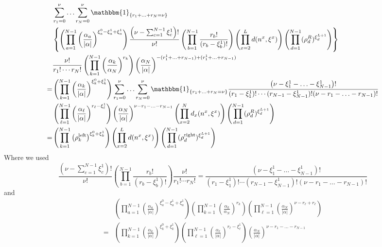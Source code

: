 \documentclass[10pt]{article}
\numberwithin{equation}{section}
\numberwithin{equation}{subsection}
\begin{document}
\begin{align}\label{pezzo1}
	&\sum_{r_{1}=0}^{\nu}\ldots\sum_{r_{N}=0}^{\nu}\mathbbm{1}_{\{r_{1}+\ldots+r_{N}=\nu\}}\nonumber\\
	&\left\{\left(\prod_{a=1}^{N-1}\left(\frac{\alpha_{a}}{|\alpha|}\right)^{\xi_{a}^{0}-\xi_{a}^{1}+\xi_{a}^{1}}\right)\frac{\left(\nu-\sum_{c=1}^{N-1}\xi_{c}^{1}\right)!}{\nu!}\left(\prod_{b=1}^{N-1}\frac{r_{b}!}{(r_{b}-\xi^{1}_{b})!}\right)\left(\prod_{x=2}^{L}d(n^{x},\xi^{x})\right)\left(\prod_{d=1}^{N-1}(\rho_{d}^{R})^{\xi_{d}^{L+1}}\right)\right\}\nonumber\\
	&	\frac{\nu!}{r_{1}!\cdots r_{N}!}\left(\prod_{k=1}^{N-1}\left(\frac{\alpha_{k}}{\alpha_{N}}\right)^{r_{k}}\right)\left(\frac{\alpha_{N}}{|\alpha|}\right)^{-(r_{1}^{1}+\ldots+r_{N-1})+(r_{1}^{1}+\ldots+r_{N-1})}\nonumber\\=&
	\left(\prod_{k=1}^{N-1}\left(\frac{\alpha_{k}}{|\alpha|}\right)^{\xi_{k}^{0}+\xi_{k}^{1}}\right)\sum_{r_{1}=0}^{\nu}\ldots\sum_{r_{N}=0}^{\nu}\mathbbm{1}_{\{r_{1}+\ldots+r_{N}=\nu\}}	\frac{\left(\nu-\xi_{1}^{1}-\ldots-\xi_{N-1}^{1}\right)!}{(r_{1}-\xi_{1}^{1})!\cdots(r_{N-1}-\xi_{N-1}^{1})!(\nu-r_{1}-\ldots-r_{N-1})!}\nonumber\\&
	\left(\prod_{\ell=1}^{N-1}\left(\frac{\alpha_{\ell}}{|\alpha|}\right)^{r_{\ell}-\xi_{\ell}^{1}}\right)\left(\frac{\alpha_{N}}{|\alpha|}\right)^{\nu-r_{1}-\ldots-r_{N-1}}\left(\prod_{x=2}^{N}d_{x}(n^{x},\xi^{x})\right)\left(\prod_{d=1}^{N-1}(\rho_{d}^{R})^{\xi_{d}^{L+1}}\right)\nonumber
	\\=&
	\left(\prod_{k=1}^{N-1}\left(\rho_{k}^{\text{left}}\right)^{\xi_{k}^{0}+\xi_{k}^{1}}\right)\left(\prod_{x=2}^{L}d(n^{x},\xi^{x})\right)\left(\prod_{d=1}^{N-1}(\rho_{d}^{\text{right}})^{\xi_{d}^{L+1}}\right)
\end{align}
Where we used 
\begin{equation*}
\frac{\left(\nu-\sum_{c=1}^{N-1}\xi_{c}^{1}\right)!}{\nu!}\left(\prod_{b=1}^{N-1}\frac{r_{b}!}{(r_{b}-\xi^{1}_{b})!}\right)\frac{\nu!}{r_{1}!\cdots r_{N}!}=\frac{\left(\nu-\xi_{1}^{1}-\ldots-\xi_{N-1}^{1}\right)!}{(r_{1}-\xi_{1}^{1})!\cdots(r_{N-1}-\xi_{N-1}^{1})!(\nu-r_{1}-\ldots-r_{N-1})!}
\end{equation*}
and 
\begin{align*}
&\left(\prod_{a=1}^{N-1}\left(\frac{\alpha_{a}}{|\alpha|}\right)^{\xi_{a}^{0}-\xi_{a}^{1}+\xi_{a}^{1}}\right)\left(\prod_{k=1}^{N-1}\left(\frac{\alpha_{k}}{\alpha_{N}}\right)^{r_{k}}\right)\left(\prod_{\ell=1}^{N-1}\left(\frac{\alpha_{N}}{|\alpha|}\right)^{\nu-r_{\ell}+r_{\ell}}\right)\\=&	\left(\prod_{k=1}^{N-1}\left(\frac{\alpha_{k}}{|\alpha|}\right)^{\xi_{k}^{0}+\xi_{k}^{1}}\right)\left(\prod_{\ell=1}^{N-1}\left(\frac{\alpha_{\ell}}{|\alpha|}\right)^{r_{\ell}-\xi_{\ell}^{1}}\right)\left(\frac{\alpha_{N}}{|\alpha|}\right)^{\nu-r_{1}-\ldots-r_{N-1}}
\end{align*}
\end{document}
